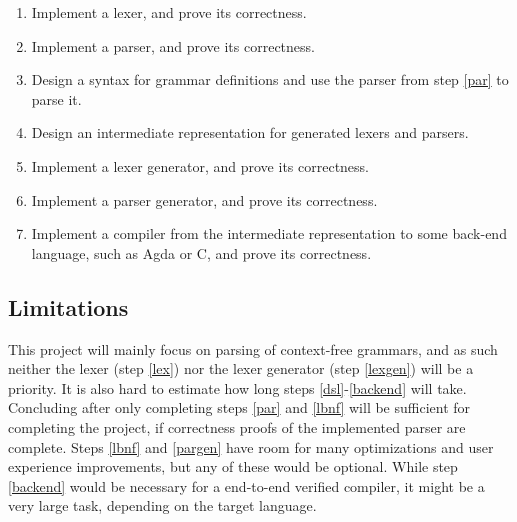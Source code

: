 \documentclass{article}
\begin{document}
	\begin{enumerate}

		\item \label{lex}

			Implement a lexer, and prove its correctness.

		\item \label{par}

			Implement a parser, and prove its correctness.

		\item \label{lbnf}

			Design a syntax for grammar definitions and use the parser from
			step \ref{par} to parse it.

		\item \label{dsl}

			Design an intermediate representation for generated lexers and
			parsers.

		\item \label{lexgen}

			Implement a lexer generator, and prove its correctness.

		\item \label{pargen}

			Implement a parser generator, and prove  its correctness.

		\item \label{backend}

			Implement a compiler from the intermediate representation to some
			back-end language, such as Agda or C, and prove its correctness.

	\end{enumerate}

	\subsection{Limitations}


		This project will mainly focus on parsing of context-free grammars, and
		as such neither the lexer (step \ref{lex}) nor the lexer generator
		(step \ref{lexgen}) will be a priority. It is also hard to estimate how
		long steps \ref{dsl}-\ref{backend} will take. Concluding after only
		completing steps \ref{par} and \ref{lbnf} will be sufficient for
		completing the project, if correctness proofs of the implemented parser
		are complete.  Steps \ref{lbnf} and \ref{pargen} have room for many
		optimizations and user experience improvements, but any of these would
		be optional. While step \ref{backend} would be necessary for a
		end-to-end verified compiler, it might be a very large task, depending
		on the target language.
\end{document}
